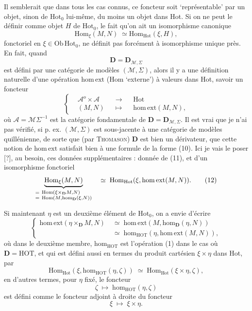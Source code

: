 \documentclass[11pt]{article}
\newcommand{\printedpage}[1]{\marginpar{\footnotesize p.~#1}}
\newcommand{\msp}[1]{\marginpar{\footnotesize [#1]}}
\newcommand{\Hot}{\mathrm{Hot}}
\newcommand{\D}{\mathbf{D}}
\newcommand{\hm}{\mathrm{hom}}
\newcommand{\Hom}{\mathrm{Hom}}
\newcommand{\homext}{\mathrm{hom}\,\mathrm{ext}}
\newcommand{\HOT}{\mathrm{HOT}}
\newcommand{\Ob}{\mathrm{Ob}\,}
\begin{document}
Il semblerait que dans tous les cas connus, ce foncteur soit ‘représentable’ par un objet, sinon de $\Hot_0$ lui-même, du moins un objet dans Hot. Si on ne peut le définir comme objet $H$ de $\Hot_0$, le fait qu’on ait un isomorphisme canonique
\[
\Hom_{\xi}(M,N)\;\simeq\Hom_{\Hot}(\xi,H),
\tag*{(10)}
\]
fonctoriel en $\xi\in\Ob\Hot_0$, ne définit pas forcément
\msp{page 8}
à isomorphisme unique près. En fait, quand
\[
\D=\D_{\mathcal{M},\Sigma}
\]
est défini par une catégorie de modèles $(\mathcal{M},\Sigma)$, alors il y a une définition naturelle d’une opération $\homext$ (Hom ‘externe’) à valeurs dans Hot, savoir un foncteur
\[
\left\{
\begin{aligned}
&\mathcal{A}^o\times\mathcal{A} &&\longrightarrow &&\mathrm{Hot}\\
&(M,N) &&\longmapsto &&\homext(M,N),
\end{aligned}
\right.
\tag*{(11)}
\]
où $\mathcal{A}=\mathcal{M}\Sigma^{-1}$ est la catégorie fondamentale de $\D=\D_{\mathcal{M},\Sigma}$. Il est vrai que je n’ai pas vérifié, si p. ex. $(\mathcal{M},\Sigma)$ est sous-jacente à une catégorie de modèles quillénienne, de sorte que (par \textsc{Thomason}) $\D$ est bien un dérivateur, que cette notion de $\homext$ satisfait bien à une formule de la forme (10). Ici je vais le poser [?], au besoin, ces données supplémentaires : donnée de (11), et d’un isomorphisme fonctoriel
\[
\underbrace{\Hom_{\xi}(M,N)}_{\begin{subarray}{l}=\ \Hom(\xi\times_{\D}M,N)\\ =\ \Hom(M,\hm_{\D}(\xi,N))\end{subarray}}
\quad\simeq\;\Hom_{\Hot}(\xi,\homext(M,N)).
\tag*{(12)}
\]

\printedpage{6}
\msp{page 9}
Si maintenant $\eta$ est un deuxième élément de $\Hot_0$, on a envie d’écrire
\[
\left\{
\begin{aligned}
\homext(\eta\times_{\D}M,N) &\;\simeq\;\homext(M,\hm_{\D}(\eta,N))\\
&\;\simeq\;\hm_{\HOT}(\eta,\homext(M,N)),
\end{aligned}
\right.
\tag*{(13)}
\]
où dans le deuxième membre, $\hm_{\HOT}$ est l’opération (1) dans le cas où $\D=\mathrm{HOT}$, et qui est défini aussi en termes du produit cartésien $\xi\times\eta$ dans Hot, par
\[
\Hom_{\Hot}(\xi,\hm_{\HOT}(\eta,\zeta))\;\simeq\;\Hom_{\Hot}(\xi\times\eta,\zeta),
\]
en d’autres termes, pour $\eta$ fixé, le foncteur
\[
\zeta\;\longmapsto\;\hm_{\HOT}(\eta,\zeta)
\]
est défini comme le foncteur adjoint à droite du foncteur
\[
\xi\;\longmapsto\;\xi\times\eta.
\]
\end{document}
